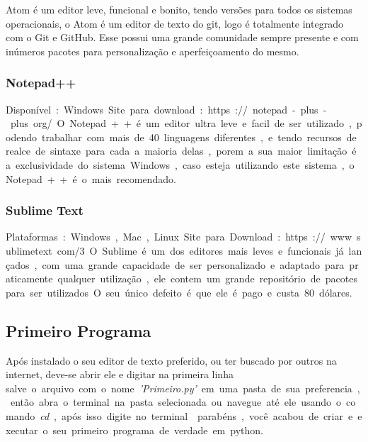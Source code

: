 \indent Atom é um editor leve, funcional e bonito, tendo versões para todos os sistemas operacionais, o Atom é um editor de texto do git, logo é totalmente integrado com o Git e GitHub. Esse possui uma grande comunidade sempre presente e com inúmeros pacotes para personalização e aperfeiçoamento do mesmo.

\subsubsection{Notepad++}

\si Disponível: Windows

\si Site para download: https://notepad-plus-plus.org/

\indent O Notepad++ é um editor ultra leve e facil de ser utilizado, podendo trabalhar com mais de 40 linguagens diferentes, e tendo recursos de realce de sintaxe para cada a maioria delas, porem a sua maior limitação é a exclusividade do sistema Windows, caso esteja utilizando este sistema, o Notepad++ é o mais recomendado.

\subsubsection{Sublime Text}

\si Plataformas: Windows, Mac, Linux

\si Site para Download: https://www.sublimetext.com/3

O Sublime é um dos editores mais leves e funcionais já lançados, com uma grande capacidade de ser personalizado e adaptado para praticamente qualquer utilização, ele contem um grande repositório de pacotes para ser utilizados. O seu único defeito é que ele é pago e custa 80 dólares.

\subsection{Primeiro Programa}
Após instalado o seu editor de texto preferido, ou ter buscado por outros na internet, deve-se abrir ele e digitar na primeira linha
\si salve o arquivo com o nome \emph{'Primeiro.py'} em uma pasta de sua preferencia, então abra o terminal na pasta selecionada ou navegue até ele usando o comando \emph{cd}, após isso digite no terminal
\si parabéns, você acabou de criar e executar o seu primeiro programa de verdade em python.
